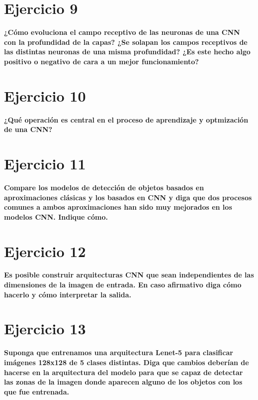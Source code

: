 \documentclass[11pt,a4paper]{article}
\begin{document}
\section*{Ejercicio 9}

\textbf{¿Cómo evoluciona el campo receptivo de las neuronas de una CNN con la profundidad de la capas? ¿Se solapan los campos receptivos de las distintas neuronas de
una misma profundidad? ¿Es este hecho algo positivo o negativo de cara a un mejor funcionamiento?}




\section*{Ejercicio 10}

\textbf{¿Qué operación es central en el proceso de aprendizaje y optmización de una CNN?}




\section*{Ejercicio 11}

\textbf{Compare los modelos de detección de objetos basados en aproximaciones clásicas y los basados en CNN y diga que dos procesos comunes a ambos aproximaciones han
sido muy mejorados en los modelos CNN. Indique cómo.}



\section*{Ejercicio 12}

\textbf{Es posible construir arquitecturas CNN que sean independientes de las dimensiones de la imagen de entrada. En caso afirmativo diga cómo hacerlo y cómo
interpretar la salida.}




\section*{Ejercicio 13}

\textbf{Suponga que entrenamos una arquitectura Lenet-5 para clasificar imágenes 128x128 de 5 clases distintas. Diga que cambios deberían de hacerse en la arquitectura
del modelo para que se capaz de detectar las zonas de la imagen donde aparecen alguno de los objetos con los que fue entrenada.}
\end{document}
